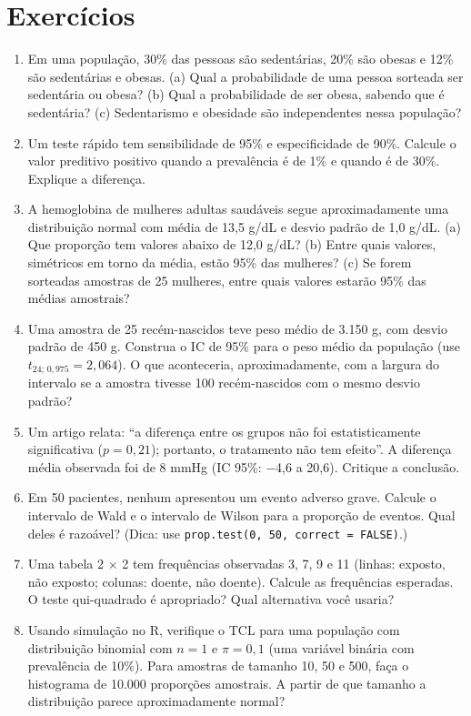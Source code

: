 \documentclass[
]{book}
\begin{document}
\section{Exercícios}\label{exercuxedcios-4}

\begin{enumerate}
\def\labelenumi{\arabic{enumi}.}
\item
  Em uma população, 30\% das pessoas são sedentárias, 20\% são obesas e 12\% são sedentárias e obesas. (a) Qual a probabilidade de uma pessoa sorteada ser sedentária ou obesa? (b) Qual a probabilidade de ser obesa, sabendo que é sedentária? (c) Sedentarismo e obesidade são independentes nessa população?
\item
  Um teste rápido tem sensibilidade de 95\% e especificidade de 90\%. Calcule o valor preditivo positivo quando a prevalência é de 1\% e quando é de 30\%. Explique a diferença.
\item
  A hemoglobina de mulheres adultas saudáveis segue aproximadamente uma distribuição normal com média de 13,5 g/dL e desvio padrão de 1,0 g/dL. (a) Que proporção tem valores abaixo de 12,0 g/dL? (b) Entre quais valores, simétricos em torno da média, estão 95\% das mulheres? (c) Se forem sorteadas amostras de 25 mulheres, entre quais valores estarão 95\% das médias amostrais?
\item
  Uma amostra de 25 recém-nascidos teve peso médio de 3.150 g, com desvio padrão de 450 g. Construa o IC de 95\% para o peso médio da população (use \(t_{24;\,0{,}975} = 2{,}064\)). O que aconteceria, aproximadamente, com a largura do intervalo se a amostra tivesse 100 recém-nascidos com o mesmo desvio padrão?
\item
  Um artigo relata: ``a diferença entre os grupos não foi estatisticamente significativa (\(p = 0{,}21\)); portanto, o tratamento não tem efeito''. A diferença média observada foi de 8 mmHg (IC 95\%: −4,6 a 20,6). Critique a conclusão.
\item
  Em 50 pacientes, nenhum apresentou um evento adverso grave. Calcule o intervalo de Wald e o intervalo de Wilson para a proporção de eventos. Qual deles é razoável? (Dica: use \texttt{prop.test(0,\ 50,\ correct\ =\ FALSE)}.)
\item
  Uma tabela 2 × 2 tem frequências observadas 3, 7, 9 e 11 (linhas: exposto, não exposto; colunas: doente, não doente). Calcule as frequências esperadas. O teste qui-quadrado é apropriado? Qual alternativa você usaria?
\item
  Usando simulação no R, verifique o TCL para uma população com distribuição binomial com \(n = 1\) e \(\pi = 0{,}1\) (uma variável binária com prevalência de 10\%). Para amostras de tamanho 10, 50 e 500, faça o histograma de 10.000 proporções amostrais. A partir de que tamanho a distribuição parece aproximadamente normal?
\end{enumerate}
\end{document}
